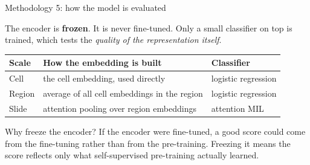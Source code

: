 \documentclass[aspectratio=169,11pt]{beamer}
\newcommand{\hl}[1]{\textcolor{haem}{\textbf{#1}}}
\begin{document}
\begin{frame}{Methodology 5: how the model is evaluated}

  The encoder is \hl{frozen}. It is never fine-tuned. Only a small classifier on
  top is trained, which tests the \emph{quality of the representation itself}.

  \vspace{0.5em}
  \begin{center}\small
  \begin{tabular}{@{}lll@{}}
    \toprule
    \textbf{Scale} & \textbf{How the embedding is built} & \textbf{Classifier} \\
    \midrule
    Cell   & the cell embedding, used directly & logistic regression \\
    Region & average of all cell embeddings in the region & logistic regression \\
    Slide  & attention pooling over region embeddings & attention MIL \\
    \bottomrule
  \end{tabular}
  \end{center}

  \vspace{0.6em}
  \begin{block}{Why freeze the encoder?}
    \small If the encoder were fine-tuned, a good score could come from the
    fine-tuning rather than from the pre-training. Freezing it means the score
    reflects only what self-supervised pre-training actually learned.
  \end{block}

\end{frame}
\end{document}
